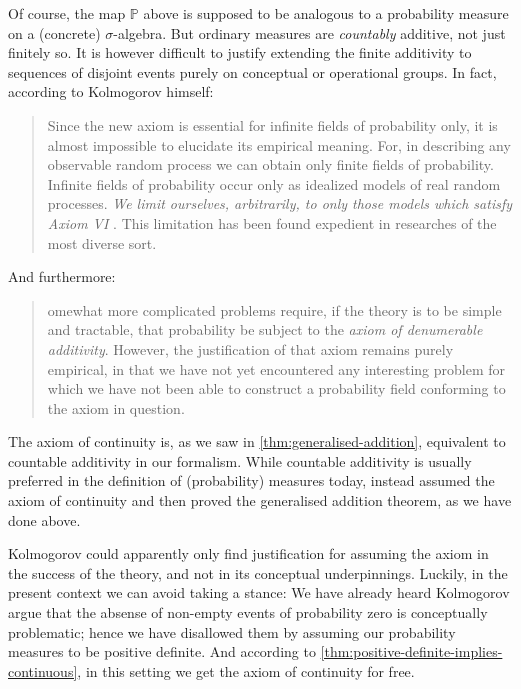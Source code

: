 \documentclass[article, a4paper, 11pt, oneside]{memoir}
\numberwithin{equation}{chapter}
\renewcommand{\P}{\mathbb{P}}
\begin{document}
Of course, the map $\P$ above is supposed to be analogous to a probability measure on a (concrete) $\sigma$-algebra. But ordinary measures are \emph{countably} additive, not just finitely so. It is however difficult to justify extending the finite additivity to sequences of disjoint events purely on conceptual or operational groups. In fact, according to Kolmogorov himself:
%
\blockquote[\cite{kolmogorov1956}]{%
    Since the new axiom  is essential for infinite fields of probability only, it is almost impossible to elucidate its empirical meaning. \textelp{} For, in describing any observable random process we can obtain only finite fields of probability. Infinite fields of probability occur only as idealized models of real random processes. \emph{We limit ourselves, arbitrarily, to only those models which satisfy Axiom VI} . This limitation has been found expedient in researches of the most diverse sort.%
}
%
And furthermore:
%
\blockquote[\cite{kolmogorov1995}]{%
    omewhat more complicated problems require, if the theory is to be simple and tractable, that probability be subject to the \emph{axiom of denumerable additivity}. However, the justification of that axiom remains purely empirical, in that we have not yet encountered any interesting problem for which we have not been able to construct a probability field conforming to the axiom in question.%
}
%
The axiom of continuity is, as we saw in \cref{thm:generalised-addition}, equivalent to countable additivity in our formalism. While countable additivity is usually preferred in the definition of (probability) measures today, \textcite{kolmogorov1956} instead assumed the axiom of continuity and then proved the generalised addition theorem, as we have done above.

Kolmogorov could apparently only find justification for assuming the axiom in the success of the theory, and not in its conceptual underpinnings. Luckily, in the present context we can avoid taking a stance: We have already heard Kolmogorov argue that the absense of non-empty events of probability zero is conceptually problematic; hence we have disallowed them by assuming our probability measures to be positive definite. And according to \cref{thm:positive-definite-implies-continuous}, in this setting we get the axiom of continuity for free.
\end{document}
